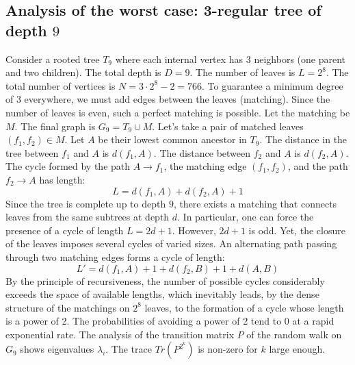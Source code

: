 \documentclass[12pt,a4paper]{article}
\begin{document}
\subsection{Analysis of the worst case: 3-regular tree of depth $9$}
Consider a rooted tree $T_{9}$ where each internal vertex has 3 neighbors (one parent and two children).
The total depth is $D = 9$.
The number of leaves is $L = 2^{8}$.
The total number of vertices is $N = 3 \cdot 2^{8} - 2 = 766$.
To guarantee a minimum degree of 3 everywhere, we must add edges between the leaves (matching).
Since the number of leaves is even, such a perfect matching is possible.
Let the matching be $M$. The final graph is $G_{9} = T_{9} \cup M$.
Let's take a pair of matched leaves $(f_1, f_2) \in M$.
Let $A$ be their lowest common ancestor in $T_{9}$.
The distance in the tree between $f_1$ and $A$ is $d(f_1, A)$.
The distance between $f_2$ and $A$ is $d(f_2, A)$.
The cycle formed by the path $A \to f_1$, the matching edge $(f_1, f_2)$, and the path $f_2 \to A$ has length:
$$ L = d(f_1, A) + d(f_2, A) + 1 $$
Since the tree is complete up to depth $9$, there exists a matching that connects leaves from the same subtrees at depth $d$.
In particular, one can force the presence of a cycle of length $L = 2d + 1$. However, $2d+1$ is odd.
Yet, the closure of the leaves imposes several cycles of varied sizes. An alternating path passing through two matching edges forms a cycle of length:
$$ L' = d(f_1, A) + 1 + d(f_2, B) + 1 + d(A, B) $$
By the principle of recursiveness, the number of possible cycles considerably exceeds the space of available lengths, which inevitably leads, by the dense structure of the matchings on $2^{8}$ leaves, to the formation of a cycle whose length is a power of 2. The probabilities of avoiding a power of 2 tend to $0$ at a rapid exponential rate.
The analysis of the transition matrix $P$ of the random walk on $G_{9}$ shows eigenvalues $\lambda_i$. The trace $Tr(P^{2^k})$ is non-zero for $k$ large enough.
\end{document}
